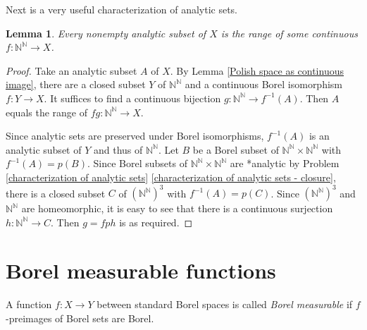 \documentclass[10pt]{amsart}
\newcommand{\NN}{\mathbb{N}}
\newtheorem{lemma}[theorem]{Lemma}
\theoremstyle{definition}
\theoremstyle{remark}
\begin{document}
Next is a very useful characterization of analytic sets. 

\begin{lemma} \label{analytic sets as continuous images of N^N} 
Every nonempty analytic subset of $X$ is the range of some continuous $f\colon \NN^\NN\rightarrow X$. 
\end{lemma} 
\begin{proof} 
Take an analytic subset $A$ of $X$. By Lemma \ref{Polish space as continuous image}, there are a closed subset $Y$ of $\NN^\NN$ and a continuous Borel isomorphism $f\colon Y\rightarrow X$. 
It suffices to find a continuous bijection $g\colon \NN^\NN\rightarrow f^{-1}(A)$. 
Then $A$ equals the range of $fg\colon \NN^\NN\rightarrow X$. 

Since analytic sets are preserved under Borel isomorphisms, $f^{-1}(A)$ is an analytic subset of $Y$ and thus of $\NN^\NN$. 
Let $B$ be a Borel subset of $\NN^\NN\times \NN^\NN$ with $f^{-1}(A)=p(B)$. 
Since Borel subsets of $\NN^\NN\times \NN^\NN$ are *analytic by Problem \ref{characterization of analytic sets} \ref{characterization of analytic sets - closure}, there is a closed subset $C$ of $(\NN^\NN)^3$ with $f^{-1}(A)=p(C)$. 
Since $(\NN^\NN)^3$ and  $\NN^\NN$ are homeomorphic, it is easy to see that there is a continuous surjection $h\colon \NN^\NN\rightarrow C$. Then $g=fph$ is as required. 
\end{proof} 






\section{Borel measurable functions} 

A function $f\colon X\rightarrow Y$ between standard Borel spaces is called \emph{Borel measurable} if $f$-preimages of Borel sets are Borel. 
\end{document}
